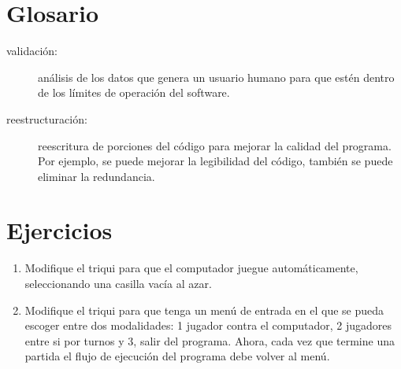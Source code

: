 \section{Glosario}
\begin{description}
\item [{validación:}] análisis de los datos que genera un usuario humano
para que estén dentro de los límites de operación del software.
\item [{reestructuración:}] reescritura de porciones del código para mejorar
la calidad del programa. Por ejemplo, se puede mejorar la legibilidad
del código, también se puede eliminar la redundancia.

 
\end{description}

\section{Ejercicios}
\begin{enumerate}
\item Modifique el triqui para que el computador juegue automáticamente,
seleccionando una casilla vacía al azar.
\item Modifique el triqui para que tenga un menú de entrada en el que se
pueda escoger entre dos modalidades: 1 jugador contra el computador,
2 jugadores entre si por turnos y 3, salir del programa. Ahora, cada
vez que termine una partida el flujo de ejecución del programa debe
volver al menú.
\end{enumerate}

